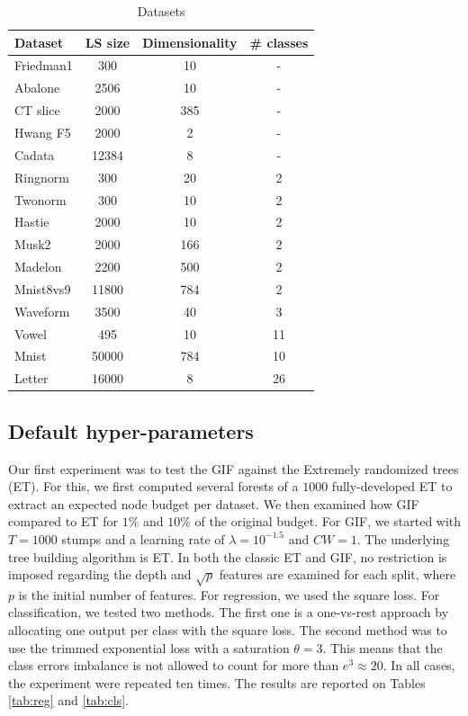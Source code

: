 \documentclass{article}
\begin{document}
\begin{table}[t]
\caption{Datasets}
\label{tab:datasets}
\vskip 0.15in
\begin{center}
\begin{small}
\begin{sc}
\begin{tabular}{l|ccc}
\hline
Dataset & LS size & Dimensionality & \# classes\\
\hline
Friedman1 & 300 & 10 & - \\
Abalone & 2506 & 10 & - \\
CT slice & 2000 & 385 & - \\
Hwang F5 & 2000 & 2 & - \\
Cadata & 12384 & 8 & - \\
Ringnorm & 300 & 20 & 2 \\
Twonorm & 300 & 10 & 2 \\
Hastie & 2000 & 10 & 2 \\
Musk2 & 2000 & 166 & 2 \\
Madelon & 2200 & 500 & 2 \\
Mnist8vs9 & 11800 & 784 & 2 \\
Waveform & 3500 & 40 & 3 \\
Vowel & 495 & 10 & 11 \\
Mnist & 50000 & 784 & 10 \\
Letter & 16000 & 8 & 26 \\
\hline
\end{tabular}
\end{sc}
\end{small}
\end{center}
\vskip -0.1in
\end{table}

\subsection{Default hyper-parameters}
\label{subsec:defaultHP}

Our first experiment was to test the GIF against the Extremely randomized trees 
(ET).
For this, we first computed several forests of a $1000$ fully-developed ET to 
extract an expected node budget per dataset. We then examined how GIF compared 
to ET for $1\%$ and $10\%$ of the original budget.
For GIF, we started with $T=1000$ stumps and a learning rate of $\lambda = 
10^{-1.5}$ and $CW=1$. The underlying tree building algorithm is ET. In both 
the classic ET and GIF, no restriction is imposed regarding the depth and 
$\sqrt{p}$ features are examined for each split, where $p$ is the initial 
number of features.
For regression, we used the square loss.
For classification, we tested two methods. The first one is a one-vs-rest 
approach by allocating one output per class with the square loss. The second 
method was to use the trimmed exponential loss with a saturation $\theta = 3$. 
This means that the class errors imbalance is not allowed to count for more 
than $e^3 \approx 20$. In all cases, the experiment were repeated ten times. 
The results are reported on Tables \ref{tab:reg} and \ref{tab:cls}.
  
\end{document}
